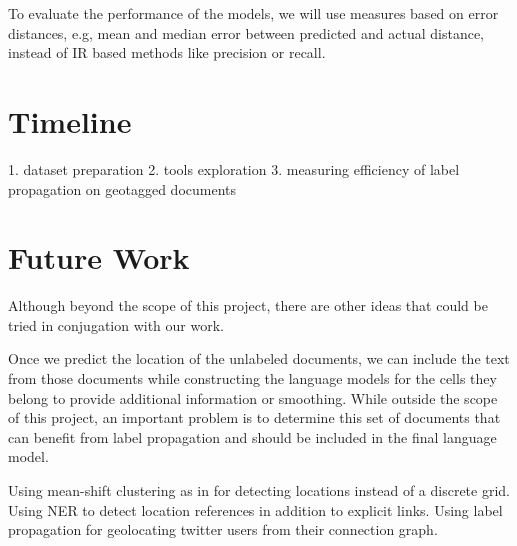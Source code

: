 \documentclass[11pt]{article}
\begin{document}

To evaluate the performance of the models, we will use measures based on error distances, 
e.g, mean and median error between predicted and actual distance,  
instead of IR based methods like precision or recall.

\section{Timeline}
1. dataset preparation
2. tools exploration
3. measuring efficiency of label propagation on geotagged documents

\section{Future Work}
Although beyond the scope of this project, there are other ideas that could be tried in conjugation with our work.

Once we predict the location of the unlabeled documents, we can include the text from those documents
while constructing the language models for the cells they belong to provide additional information or smoothing.
While outside the scope of this project, an important problem is to determine this set of documents 
that can benefit from label propagation and should be included in the final language model.

Using mean-shift clustering as in \cite{Grauman} for detecting locations instead of a discrete grid.
Using NER to detect location references in addition to explicit links.
Using label propagation for geolocating twitter users from their connection graph.




\end{document}
